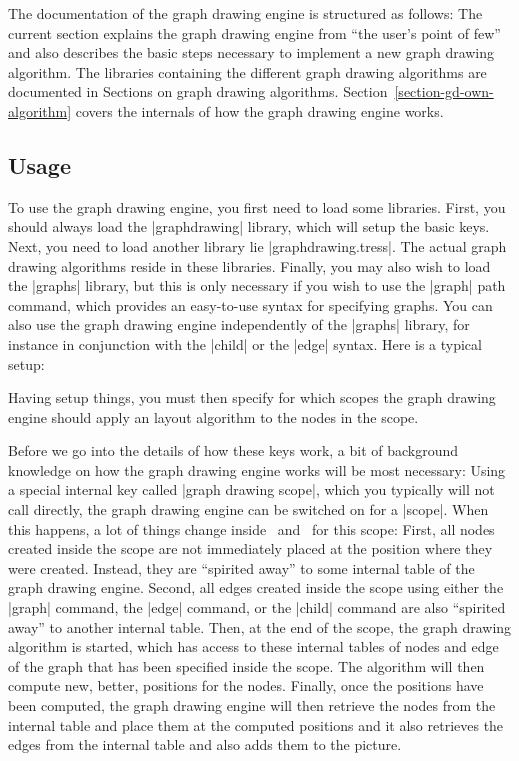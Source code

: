 The documentation of the graph drawing engine is structured as
follows: The current section explains the graph drawing engine from
``the user's point of few'' and also describes the basic steps
necessary to implement a new graph drawing algorithm. The libraries
containing the different graph drawing algorithms are documented in
Sections on graph drawing
algorithms. Section~\ref{section-gd-own-algorithm} covers the
internals of how the graph drawing engine works. 




\subsection{Usage}

To use the graph drawing engine, you first need to load some
libraries. First, you should always load the |graphdrawing| library,
which will setup the basic keys. Next, you need to load another
library lie |graphdrawing.tress|. The actual graph drawing
algorithms reside in these libraries. Finally, you may also wish to
load the |graphs| library, but this is only necessary if you wish to
use the |graph| path command, which provides an easy-to-use syntax for
specifying graphs. You can also use the graph drawing engine
independently of the |graphs| library, for instance in conjunction
with the |child| or the |edge| syntax. Here is a typical setup:

\begin{codeexample}
\usetikzlibrary{graphs, graphdrawing, graphdrawing.trees}  
\end{codeexample}

Having setup things, you must then specify for which scopes the
graph drawing engine should apply an layout algorithm to the nodes in
the scope.

Before we go into the details of how these keys work, a bit of
background knowledge on how the graph drawing engine works will be
most necessary: Using a special internal key called
|graph drawing scope|, which you typically will not call directly,
the graph drawing engine can be switched on for a |{scope}|. When this
happens, a lot of things change inside \pgfname\ and \tikzname\ for
this scope: First, all nodes created inside the scope are not
immediately placed at the position where they were created. Instead,
they are ``spirited away'' to some internal table of the graph drawing
engine. Second, all edges created inside the scope using either the
|graph| command, the |edge| command, or the |child| command are also
``spirited away'' to another internal table. Then, at the end of the
scope, the graph drawing algorithm is started, which has access to
these internal tables of nodes and edge of the graph that has been
specified inside the scope. The algorithm will then compute new,
better, positions for the nodes. Finally, once the positions have been
computed, the graph drawing engine will then retrieve the nodes from
the internal table and place them at the computed positions and it
also retrieves the edges from the internal table and also adds them to
the picture.

